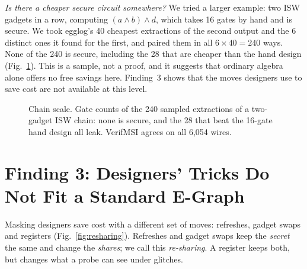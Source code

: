 \documentclass[conference]{IEEEtran}
\begin{document}
\emph{Is there a cheaper secure circuit somewhere?} We tried a larger example: two ISW gadgets in a row, computing $(a\wedge b)\wedge d$, which takes 16 gates by hand and is secure. We took egglog's 40 cheapest extractions of the second output and the 6 distinct ones it found for the first, and paired them in all $6\times40=240$ ways. None of the 240 is secure, including the 28 that are cheaper than the hand design (Fig.~\ref{fig:chain}). This is a sample, not a proof, and it suggests that ordinary algebra alone offers no free savings here. Finding~3 shows that the moves designers use to save cost are not available at this level.

\begin{figure}[!t]
\centering
{}
\caption{Chain scale. Gate counts of the 240 sampled extractions of a two-gadget ISW chain: none is secure, and the 28 that beat the 16-gate hand design all leak. VerifMSI agrees on all 6,054 wires.}\label{fig:chain}
\end{figure}

\section{Finding 3: Designers' Tricks Do Not Fit a Standard E-Graph}\label{sec:rq3}
Masking designers save cost with a different set of moves: refreshes, gadget swaps and registers (Fig.~\ref{fig:resharing}). Refreshes and gadget swaps keep the \emph{secret} the same and change the \emph{shares}; we call this \emph{re-sharing}. A register keeps both, but changes what a probe can see under glitches.
\end{document}
